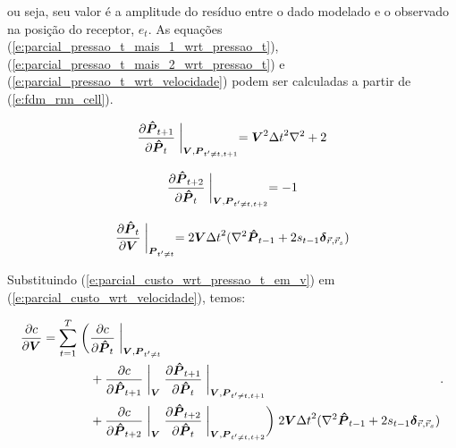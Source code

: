   \noindent ou seja, seu valor é a amplitude do resíduo entre o dado modelado e o observado na posição do receptor, $e_t$. As equações (\ref{e:parcial_pressao_t_mais_1_wrt_pressao_t}), (\ref{e:parcial_pressao_t_mais_2_wrt_pressao_t}) e (\ref{e:parcial_pressao_t_wrt_velocidade}) podem ser calculadas a partir de (\ref{e:fdm_rnn_cell}).


  \begin{equation} \label{e:parcial_pressao_t_mais_1_wrt_pressao_t}
    \frac{\partial \boldsymbol{\hat{P}}_{t+1}}{\partial \boldsymbol{\hat{P}}_t} \biggm\lvert_{\boldsymbol{V}, \boldsymbol{P}_{t'\ne t, t+1}} =
    \boldsymbol{V}^2 {\Delta t}^2 \nabla^2 + 2
  \end{equation}

  \begin{equation} \label{e:parcial_pressao_t_mais_2_wrt_pressao_t}
    \frac{\partial \boldsymbol{\hat{P}}_{t+2}}{\partial \boldsymbol{\hat{P}}_t} \biggm\lvert_{\boldsymbol{V}, \boldsymbol{P}_{t'\ne t, t+2}} =
    -1
  \end{equation}

  \begin{equation} \label{e:parcial_pressao_t_wrt_velocidade}
    \frac{\partial \boldsymbol{\hat{P}}_{t}}{\partial \boldsymbol{V}} \biggm\lvert_{\boldsymbol{P}_{t'\ne t}} =
    2 \boldsymbol{V} {\Delta t}^2 (\nabla^2 \boldsymbol{\hat{P}}_{t-1} + 2 s_{t-1} \boldsymbol{\delta}_{\vec{r}, \vec{r}_s})
  \end{equation}

  Substituindo (\ref{e:parcial_custo_wrt_pressao_t_em_v}) em (\ref{e:parcial_custo_wrt_velocidade}), temos:

  \begin{equation} \label{e:parcial_custo_wrt_velocidade_subs_1}
    \begin{split}
      \frac{\partial c}{\partial \boldsymbol{V}} =
        \sum \limits_{t=1}^T \biggm( &
          \frac{\partial c}{\partial \boldsymbol{\hat{P}}_t} \biggm\lvert_{\boldsymbol{V}, \boldsymbol{P}_{t'\ne t}} \\
        & + \frac{\partial c}{\partial \boldsymbol{\hat{P}}_{t+1}} \biggm\lvert_{\boldsymbol{V}}
                \frac{\partial \boldsymbol{\hat{P}}_{t+1}}{\partial \boldsymbol{\hat{P}}_{t}} \biggm\lvert_{\boldsymbol{V}, \boldsymbol{P}_{t'\ne t, t+1}} \\
        & + \frac{\partial c}{\partial \boldsymbol{\hat{P}}_{t+2}} \biggm\lvert_{\boldsymbol{V}}
                \frac{\partial \boldsymbol{\hat{P}}_{t+2}}{\partial \boldsymbol{\hat{P}}_{t}} \biggm\lvert_{\boldsymbol{V}, \boldsymbol{P}_{t'\ne t, t+2}}
        \biggm)
        2 \boldsymbol{V} {\Delta t}^2 (\nabla^2 \boldsymbol{\hat{P}}_{t-1} + 2 s_{t-1} \boldsymbol{\delta}_{\vec{r}, \vec{r}_s})
    \end{split}
    .
  \end{equation}

